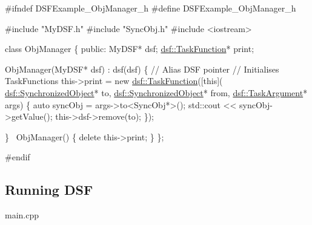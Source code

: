\begin{DoxyCodeInclude}
\textcolor{preprocessor}{#ifndef DSFExample\_ObjManager\_h}
\textcolor{preprocessor}{#define DSFExample\_ObjManager\_h}

\textcolor{preprocessor}{#include "MyDSF.h"}
\textcolor{preprocessor}{#include "SyncObj.h"}
\textcolor{preprocessor}{#include <iostream>}

\textcolor{keyword}{class }ObjManager
\{
\textcolor{keyword}{public}:
    MyDSF* dsf;
    \hyperlink{namespacedsf_aa16e735f29587f4485b56fc46746f7a9}{dsf::TaskFunction}* print;
    
    ObjManager(MyDSF* dsf) : dsf(dsf) \{  \textcolor{comment}{// Alias DSF pointer}
        \textcolor{comment}{// Initialises TaskFunctions}
        this->print = \textcolor{keyword}{new} \hyperlink{namespacedsf_aa16e735f29587f4485b56fc46746f7a9}{dsf::TaskFunction}([\textcolor{keyword}{this}](
      \hyperlink{classdsf_1_1_synchronized_object}{dsf::SynchronizedObject}* to,
                                                   \hyperlink{classdsf_1_1_synchronized_object}{dsf::SynchronizedObject}* from,
                                                   \hyperlink{namespacedsf_abe4bf68433935a81c31a5ada9b17663a}{dsf::TaskArgument}* args)
                                               \{
                                                   \textcolor{keyword}{auto} syncObj = args->to<SyncObj*>();
                                                   std::cout << syncObj->getValue();
                                                   this->dsf->remove(to);
                                               \});

    \}
    ~ObjManager() \{
        \textcolor{keyword}{delete} this->print;
    \}
\};

\textcolor{preprocessor}{#endif}
\end{DoxyCodeInclude}
\hypertarget{index_main}{}\subsection{Running D\+S\+F}\label{index_main}
main.\+cpp 

